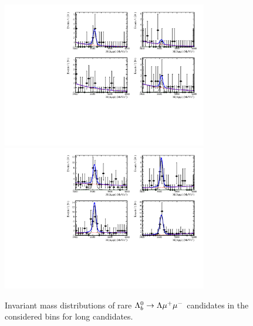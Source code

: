 \begin{figure}
\centering
\includegraphics[width=0.8\textwidth]{Lmumu/figs/MassFits/q2_fits_LL_plot2.pdf}
\includegraphics[width=0.8\textwidth]{Lmumu/figs/MassFits/q2_fits_LL_plot1.pdf}
\caption{Invariant mass distributions of rare $\Lambda^0_b\rightarrow\Lambda\mu^+\mu^-$ candidates in the considered \qsq bins
 for long candidates. }
\label{fig:Lb_differentialFitLL}
\end{figure}





